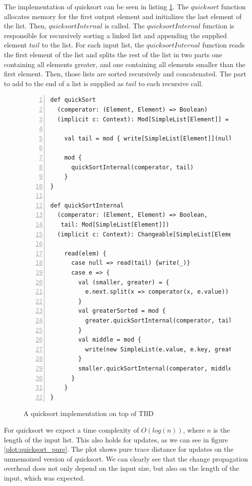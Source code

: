 The implementation of quicksort can be seen in listing \ref{code:quicksort}. The $quicksort$ function allocates memory for the first output element and initializes the last element of the list. Then, $quicksortInternal$ is called. The $quicksortInternal$ function is responsible for recursively sorting a linked list and appending the supplied element $tail$ to the list. For each input list, the $quicksortInternal$ function reads the first element of the list and splits the rest of the list in two parts one containing all elements greater, and one containing all elements smaller than the first element. Then, those lists are sorted recursively and concatenated. The part to add to the end of a list is supplied as $tail$ to each recursive call.

\begin{figure}
\begin{lstlisting}[frame=single,basicstyle=\ttfamily,numbers=left,mathescape=true]
def quickSort
  (comperator: (Element, Element) => Boolean)
  (implicit c: Context): Mod[SimpleList[Element]] = {

    val tail = mod { write[SimpleList[Element]](null) }

    mod {
      quickSortInternal(comperator, tail)
    }
}

def quickSortInternal
  (comperator: (Element, Element) => Boolean,
   tail: Mod[SimpleList[Element]])
  (implicit c: Context): Changeable[SimpleList[Element]] = {

    read(elem) {
      case null => read(tail) {write(_)}
      case e => {
        val (smaller, greater) = {
          e.next.split(x => comperator(x, e.value))
        }
        val greaterSorted = mod { 
          greater.quickSortInternal(comperator, tail) 
        }
        val middle = mod { 
          write(new SimpleList(e.value, e.key, greaterSorted)) 
        }
        smaller.quickSortInternal(comperator, middle)
      }
    }
}

\end{lstlisting}
\caption{A quicksort implementation on top of TBD}
\label{code:quicksort}
\end{figure}

For quicksort we expect a time complexity of $O(log(n))$, where $n$ is the length of the input list. This also holds for updates, as we can see in figure \ref{plot:quicksort_pure}. The plot shows pure trace distance for updates on the unmemoized version of quicksort. We can clearly see that the change propagation overhead does not only depend on the input size, but also on the length of the input, which was expected. 


